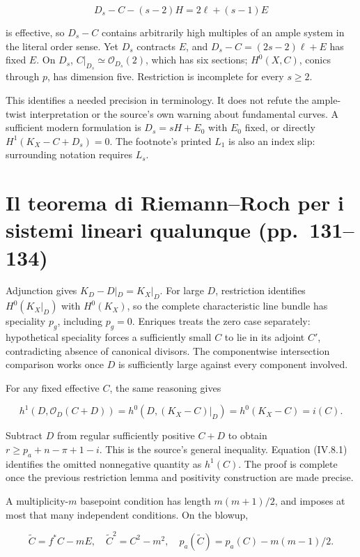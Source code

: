 \[
D_s-C-(s-2)H=2\ell+(s-1)E
\]

is effective, so \(D_s-C\) contains arbitrarily high multiples of an ample system in the literal order sense. Yet \(D_s\) contracts \(E\), and \(D_s-C=(2s-2)\ell+E\) has fixed \(E\). On \(D_s\), \(C|_{D_s}\simeq\mathcal O_{D_s}(2)\), which has six sections; \(H^0(X,C)\), conics through \(p\), has dimension five. Restriction is incomplete for every \(s\ge2\).

This identifies a needed precision in terminology. It does not refute the ample-twist interpretation or the source's own warning about fundamental curves. A sufficient modern formulation is \(D_s=sH+E_0\) with \(E_0\) fixed, or directly \(H^1(K_X-C+D_s)=0\). The footnote's printed \(L_1\) is also an index slip: surrounding notation requires \(L_s\).

\section[Riemann--Roch per ogni sistema]{Il teorema di Riemann--Roch per i sistemi lineari qualunque (pp.~131--134)}\label{enriques-iv-11}

Adjunction gives \(K_D-D|_D=K_X|_D\). For large \(D\), restriction identifies \(H^0(K_X|_D)\) with \(H^0(K_X)\), so the complete characteristic line bundle has speciality \(p_g\), including \(p_g=0\). Enriques treats the zero case separately: hypothetical speciality forces a sufficiently small \(C\) to lie in its adjoint \(C'\), contradicting absence of canonical divisors. The componentwise intersection comparison works once \(D\) is sufficiently large against every component involved.

For any fixed effective \(C\), the same reasoning gives

\[
h^1(D,\mathcal O_D(C+D))
=h^0(D,(K_X-C)|_D)=h^0(K_X-C)=i(C).
\]

Subtract \(D\) from regular sufficiently positive \(C+D\) to obtain \(r\ge p_a+n-\pi+1-i\). This is the source's general inequality. Equation (IV.8.1) identifies the omitted nonnegative quantity as \(h^1(C)\). The proof is complete once the previous restriction lemma and positivity construction are made precise.

A multiplicity-\(m\) basepoint condition has length \(m(m+1)/2\), and imposes at most that many independent conditions. On the blowup,

\[
\widetilde C=f^*C-mE,\quad
\widetilde C^2=C^2-m^2,\quad
p_a(\widetilde C)=p_a(C)-m(m-1)/2.
\]

